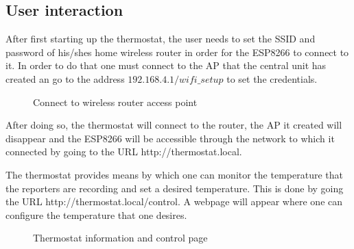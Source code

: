 \subsection{User interaction}

\qquad After first starting up the thermostat, the user needs to set the SSID and password of his/shes home wireless
router in order for the ESP8266 to connect to it. In order to do that one must connect to the AP that the
central unit has created an go to the address $192.168.4.1/wifi\_setup$ to set the credentials.

\begin{figure}[h!]
    \label{fig:connect_ap}
    \centerline{}
    \caption[Connect to wireless router access point]{Connect to wireless router access point}
    \label{fig:connect_ap}
\end{figure}

After doing so, the thermostat will connect to the router, the AP it created will disappear and the ESP8266
will be accessible through the network to which it connected by going to the URL http://thermostat.local.

The thermostat provides means by which one can monitor the temperature that the reporters are recording and
set a desired temperature. This is done by going the URL http://thermostat.local/control. A webpage will
appear where one can configure the temperature that one desires.

\begin{figure}[h!]
    \label{fig:control}
    \centerline{}
    \caption[Thermostat information and control page]{Thermostat information and control page}
    \label{fig:control}
\end{figure}

